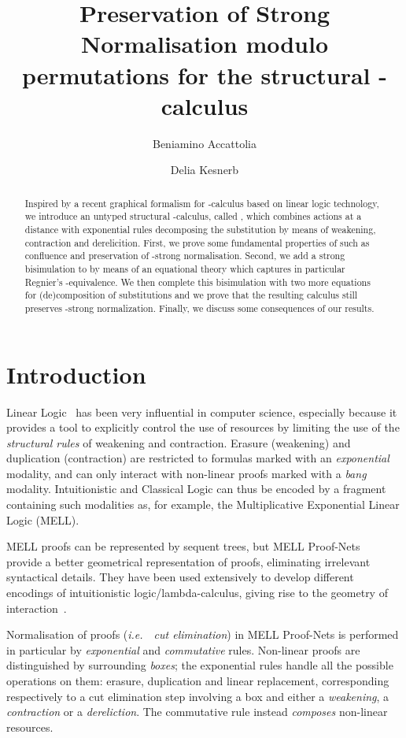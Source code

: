 \documentclass{LMCS}
\title[PSN  modulo permutations for 
the structural lambda calculus]{Preservation of Strong Normalisation modulo permutations for 
the structural -calculus}
\author[B.~Accattoli]{Beniamino Accattoli\rsuper a}
\author[D.~Kesner]{Delia Kesner\rsuper b}
\newcommand{\ie}{{\it  i.e.}~}
\renewcommand{\>}{\rightarrow}
\begin{document}
\begin{abstract}
Inspired by a recent  graphical formalism for -calculus based on
linear   logic  technology,   we  introduce   an   untyped  structural
-calculus, called  , which  combines actions at  a distance
with  exponential  rules  decomposing  the substitution  by  means  of
weakening,  contraction  and   derelicition.   First,  we  prove  some
fundamental properties of   such as confluence and preservation
of   -strong  normalisation.    Second,  we   add   a  strong
bisimulation  to    by  means  of an  equational  theory  which
captures in particular Regnier's -equivalence.  We then complete
this  bisimulation   with  two  more   equations  for
(de)composition  of  substitutions and  we  prove  that the  resulting
calculus  still preserves  -strong normalization.   Finally, we
discuss some  consequences of our results.
\end{abstract}


\maketitle


\section*{Introduction}



Linear Logic~\cite{LL} has been very influential in computer science,
especially because it provides a tool to explicitly control the use of
resources by limiting the use of the \textit{structural rules} of
weakening and contraction.  Erasure (weakening) and duplication
(contraction) are restricted to formulas marked with an
\textit{exponential} modality, and can
only interact with non-linear proofs marked with a
\textit{bang} modality.  Intuitionistic
and Classical Logic can thus be encoded by a fragment containing such
modalities as, for example, the Multiplicative Exponential Linear
Logic (MELL).



MELL proofs can be represented by sequent trees, but MELL
Proof-Nets~\cite{LL} provide a better geometrical representation of
proofs, eliminating irrelevant syntactical details.  They have been
used extensively to develop different encodings of intuitionistic
logic/lambda-calculus, giving rise to the geometry of
interaction~\cite{GOI}.

Normalisation of proofs (\ie\ \textit{cut elimination}) in MELL
Proof-Nets is performed in particular by \textit{exponential} and
\textit{commutative} rules.  Non-linear proofs are distinguished by
surrounding \textit{boxes}; the exponential rules handle all the
possible operations on them: erasure, duplication and linear replacement,
corresponding respectively to a cut elimination step involving a box
and either a \textit{weakening}, a \textit{contraction} or a
\textit{dereliction}. The commutative rule instead \textit{composes}
non-linear resources.
\end{document}
